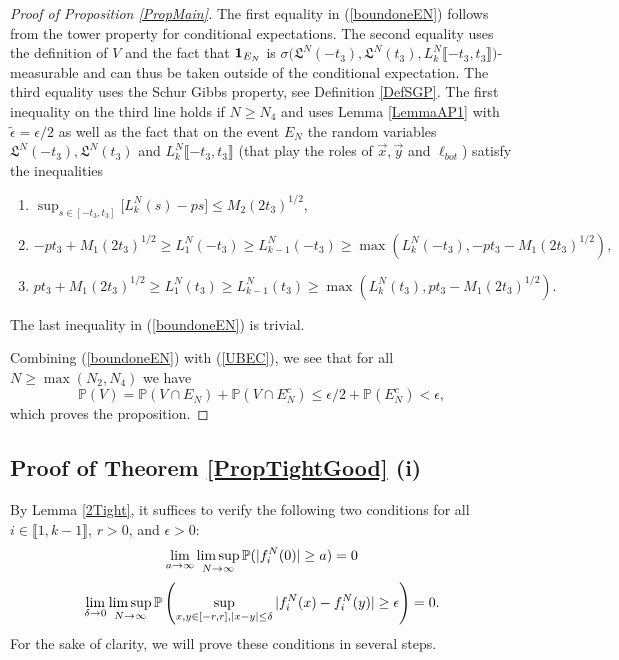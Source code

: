 \begin{proof}[Proof of Proposition \ref{PropMain}]
	The first equality in (\ref{boundoneEN}) follows from the tower property for conditional expectations. The second equality uses the definition of $V$ and the fact that ${\bf 1}_{E_N} $ is $\sigma \big( \mathfrak{L}^N(-t_3),  \mathfrak{L}^N(t_3),L^N_k\llbracket -t_3, t_3\rrbracket   \big)$-measurable and can thus be taken outside of the conditional expectation. The third equality uses the Schur Gibbs property, see Definition \ref{DefSGP}. The first inequality on the third line holds if $N \geq N_4$ and uses Lemma \ref{LemmaAP1} with $\tilde{\epsilon} = \epsilon/2$  as well as the fact that on the event $E_N$ the random variables $\mathfrak{L}^N(-t_3), \mathfrak{L}^N(t_3)$ and $L^N_k \llbracket -t_3, t_3 \rrbracket$ (that play the roles of $\vec{x}, \vec{y}$ and $\ell_{bot}$) satisfy the inequalities 
	\begin{enumerate}
		\item $\sup_{s \in [- t_3,t_3]}\big[L^N_k(s)  - ps \big]  \leq M_2 (2t_3)^{1/2}$,
		\item  $-pt_3 + M_1 (2t_3)^{1/2} \geq  {L}^N_1(-t_3) \geq  {L}^N_{k-1}(-t_3) \geq \max\left(L^N_k(-t_3), -pt_3- M_1 (2t_3)^{1/2}\right),$
		\item $pt_3 + M_1 (2t_3)^{1/2} \geq {L}^N_1(t_3) \geq {L}^N_{k-1}(t_3) \geq  \max \left(L^N_k(t_3),  p t_3- M_1(2t_3)^{1/2} \right).$
	\end{enumerate}
	The last inequality in (\ref{boundoneEN}) is trivial.
	
	Combining (\ref{boundoneEN}) with (\ref{UBEC}), we see that for all $N \geq \max(N_2, N_4)$ we have
	$$\mathbb{P}\left( V  \right) = \mathbb{P}(V \cap E_N) + \mathbb{P}(V \cap E_N^c) \leq \epsilon/2 + \mathbb{P}(E_N^c) < \epsilon,$$
	which proves the proposition.
\end{proof}


%
\subsection{Proof of Theorem \ref{PropTightGood} (i) }\label{Section4.2}

By Lemma \ref{2Tight}, it suffices to verify the following two conditions for all $i \in \llbracket 1,k-1\rrbracket$, $r>0$, and $\epsilon>0$:
\begin{equation}\label{ThmCond1}
\lim_{a\to\infty} \limsup_{N\to\infty} \mathbb{P}(|f^N_i(0)|\geq a) = 0 
\end{equation}
\begin{equation}\label{ThmCond2}
\lim_{\delta\to 0} \limsup_{N\to\infty} \mathbb{P}\left(\sup_{{x,y\in [-r,r], |x-y|\leq\delta}} |f^N_i(x) - f^N_i(y)| \geq \epsilon \right)= 0.
\end{equation}
For the sake of clarity, we will prove these conditions in several steps.\\

